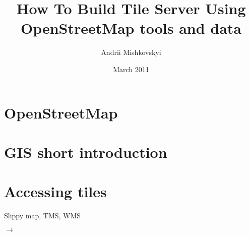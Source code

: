 \documentclass{article}
\begin{document}
\title{How To Build Tile Server Using OpenStreetMap tools and data}
\author{Andrii Mishkovskyi}
\date{March 2011}

\maketitle

\section{OpenStreetMap}
\section{GIS short introduction}
\section{Accessing tiles}
Slippy map, TMS, WMS

\begin{math}
  \rightarrow
\end{math}
\end{document}
